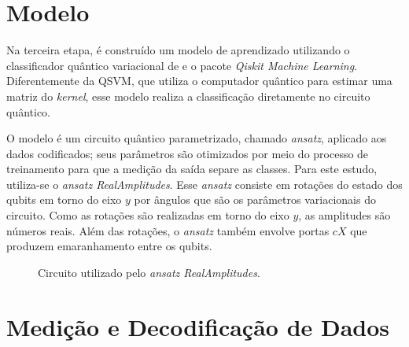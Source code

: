 \section{Modelo} \label{ansatz}

Na terceira etapa, é construído um modelo de aprendizado utilizando o classificador quântico variacional de  e o pacote \textit{Qiskit Machine Learning}. Diferentemente da QSVM, que utiliza o computador quântico para estimar uma matriz do \textit{kernel}, esse modelo realiza a classificação diretamente no circuito quântico.

O modelo é um circuito quântico parametrizado, chamado \textit{ansatz}, aplicado aos dados codificados; seus parâmetros são otimizados por meio do processo de treinamento para que a medição da saída separe as classes. Para este estudo, utiliza-se o \textit{ansatz RealAmplitudes}. Esse \textit{ansatz} consiste em rotações do estado dos qubits em torno do eixo $y$ por ângulos que são os parâmetros variacionais do circuito. Como as rotações são realizadas em torno do eixo $y$, as amplitudes são números reais. Além das rotações, o \textit{ansatz} também envolve portas $cX$ que produzem emaranhamento entre os qubits.

\begin{figure}[H]
\centering
\caption{Circuito utilizado pelo \textit{ansatz RealAmplitudes}.}
\label{fig:RealAmplitudes}
\end{figure}

\section{Medição e Decodificação de Dados}

